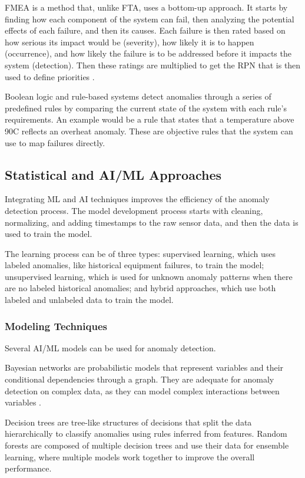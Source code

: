 \gls{FMEA} is a method that, unlike \gls{FTA}, uses a bottom-up approach.
It starts by finding how each component of the system can fail, then analyzing
the potential effects of each failure, and then its causes. Each failure is
then rated based on how serious its impact would be (severity), how likely it is
to happen (occurrence), and how likely the failure is to be addressed before
it impacts the system (detection). Then these ratings are multiplied to get
the \gls{RPN} that is then used to define priorities \cite{CambridgeFMEA}.

Boolean logic and rule-based systems detect anomalies through a series of
predefined rules by comparing the current state of the system with each
rule's requirements. An example would be a rule that states that a temperature
above 90\textdegree C reflects an overheat anomaly. These are objective rules
that the system can use to map failures directly.


\subsection{Statistical and AI/ML Approaches}
Integrating \gls{ML} and \gls{AI} techniques improves the efficiency of the
anomaly detection process.
The model development process starts with cleaning, normalizing, and adding
timestamps to the raw sensor data, and then the data is used to train the model.

The learning process can be of three types: supervised learning, which uses
labeled anomalies, like historical equipment failures, to train the model;
unsupervised learning, which is used for unknown anomaly patterns when there are
no labeled historical anomalies; and hybrid approaches, which use both labeled
and unlabeled data to train the model.

\subsubsection{Modeling Techniques}
Several \gls{AI}/\gls{ML} models can be used for anomaly detection.

Bayesian networks are probabilistic models that represent variables and their
conditional dependencies through a graph. They are adequate for anomaly
detection on complex data, as they can model complex interactions between
variables \cite{BayesServerIntro, BayesServerAnomaly}.

Decision trees are tree-like structures of decisions that split the data
hierarchically to classify anomalies using rules inferred from features.
Random forests are composed of multiple decision trees and use their data
for ensemble learning, where multiple models work together to improve the
overall performance. \cite{Zhang2022}


